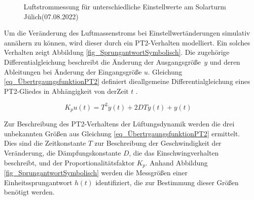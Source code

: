 \begin{figure}[h!]
    \centering
    \setlength{\fboxsep}{1pt}
    \setlength{\fboxrule}{1pt}
\caption[Luftstrommessung für unterschiedliche Einstellwerte am Solarturm Jülich\linebreak (07.08.2022)]{Luftstrommessung für unterschiedliche Einstellwerte am Solarturm Jülich\linebreak (07.08.2022)}
    \label{fig_LuftstromSolarturm}
\end{figure}

Um die Veränderung des Luftmassenstroms bei Einstellwertänderungen simulativ annähern zu können, wird dieser durch ein PT2-Verhalten modelliert.
Ein solches Verhalten zeigt Abbildung \ref{fig_SprungantwortSymbolisch}.
Die zugehörige Differentialgleichung beschreibt die Änderung der Ausgangsgröße~$y$ und deren Ableitungen bei Änderung der Eingangsgröße $u$.
Gleichung \ref{eq_ÜbertrgaungsfunktionPT2} definiert die\linebreak allgemeine Differentialgleichung eines PT2-Gliedes in Abhängigkeit von der\linebreak Zeit $t$ \cite[S.200]{Lunze}\cite[S.60]{ProfMueller}.

\begin{equation} \label{eq_ÜbertrgaungsfunktionPT2}
K_p u(t) = T^2 \ddot{y}(t)+2 D T \dot{y}(t)+y(t)
\end{equation}

Zur Beschreibung des PT2-Verhaltens der Lüftungsdynamik werden die drei unbekannten Größen aus Gleichung \ref{eq_ÜbertrgaungsfunktionPT2} ermittelt.
Dies sind die Zeitkonstante $T$ zur Beschreibung der Geschwindigkeit der Veränderung, die Dämpfungskonstante $D$, die das Einschwingverhalten beschreibt, und der Proportionalitätsfaktor $K_p$.
Anhand Abbildung \ref{fig_SprungantwortSymbolisch} werden die Messgrößen einer Einheitssprungantwort $h(t)$ identifiziert, die zur Bestimmung dieser Größen benötigt werden.\pagebreak

